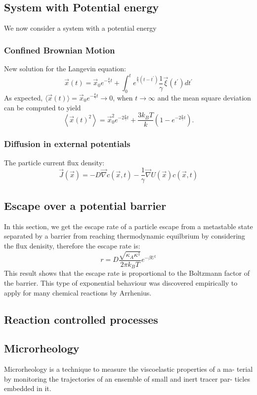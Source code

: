 \documentclass[12pt,a4paper]{article}
\begin{document}
\subsection {System with Potential energy}
We now consider a system with a potential energy
\subsubsection{Confined Brownian Motion}
New solution for the Langevin equation:
$$
\vec{x}(t)=\vec{x}_0 e^{-\frac{k}{\gamma} t}+\int_0^t e^{\frac{k}{\gamma}\left(t-t^{\prime}\right)} \frac{1}{\gamma} \vec{\xi}\left(t^{\prime}\right) d t^{\prime}
$$
As expected, $\langle\vec{x}(t)\rangle=\vec{x}_0 e^{-\frac{k}{\gamma} t} \rightarrow 0$, when $t \rightarrow \infty$ and the mean square deviation can be computed to yield
$$
\left\langle\vec{x}(t)^2\right\rangle=\vec{x}_0^2 e^{-2 \frac{k}{\gamma} t}+\frac{3 k_B T}{k}\left(1-e^{-2 \frac{k}{\gamma} t}\right) .
$$
\subsubsection{Diffusion in external potentials}
The particle current flux density:
$$
\vec{J}(\vec{x})=-D \vec{\nabla} c(\vec{x}, t)-\frac{1}{\gamma} \vec{\nabla} U(\vec{x}) c(\vec{x}, t)
$$
\subsection{Escape over a potential barrier}
In this section, we get the escape rate of a particle escape from a metastable state separated by a barrier from reaching thermodynamic equilbrium by considering the flux denisity, therefore the escape rate is:
$$
r=D \frac{\sqrt{\kappa_A \kappa^{\ddagger}}}{2 \pi k_B T} e^{-\beta U^{\ddagger}}
$$
This result shows that the escape rate is proportional to the Boltzmann factor of the barrier. This type of exponential behaviour was discovered empirically to apply for many chemical reactions by Arrhenius.
\subsection{Reaction controlled processes}
\subsection{Microrheology}
Microrheology is a technique to measure the viscoelastic properties of a ma- terial by monitoring the trajectories of an ensemble of small and inert tracer par- ticles embedded in it.
\end{document}
